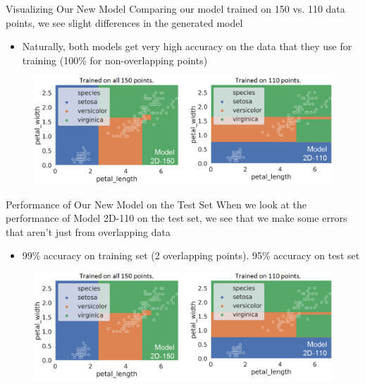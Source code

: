 \documentclass[aspectratio=169]{../latex_main/tntbeamer}  %
\begin{document}
	\begin{frame}{Visualizing Our New Model}
	   Comparing our model trained on 150 vs. 110 data points, we see slight differences in the generated model\\
	    \begin{itemize}
	        \item Naturally, both models get very high accuracy on the data that they use for training (100\% for non-overlapping points)
	    \end{itemize}
	    \begin{figure}
	        \centering
	        \includegraphics[scale=.4]{Bild31}
	    \end{figure}
	\end{frame}
	
	
	\begin{frame}{Performance of Our New Model on the Test Set}
	  When we look at the performance of Model 2D-110 on the test set, we see that we make some errors that aren’t just from overlapping data\\
	    \begin{itemize}
	        \item 99\% accuracy on training set (2 overlapping points). 95\% accuracy on test set
	    \end{itemize}
	    \begin{figure}
	        \centering
	        \includegraphics[scale=.4]{Bild31}
	    \end{figure}
	\end{frame}
	
\end{document}

